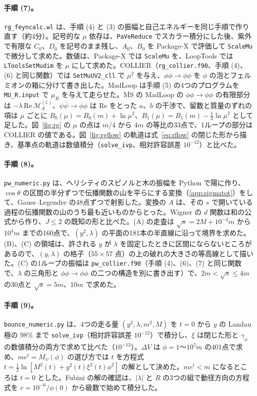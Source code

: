 \documentclass[a4paper,10pt]{ltjsarticle}
\newcommand{\MSbar}{\overline{\mathrm{MS}}}
\begin{document}
\paragraph{手順 (7)。}\texttt{rg\_feyncalc.wl} は、手順 (4) と (3) の振幅と自己エネルギーを同じ手順で作り直す（約4分）。記号的な $\mu$ 依存は、\texttt{PaVeReduce} でスカラー積分にした後、紫外で有限な $C_0$、$D_0$ を記号のまま残し、$A_0$、$B_0$ を Package-X で評価して \texttt{ScaleMu} で微分して求めた。数値は、Package-X では \texttt{ScaleMu} を、LoopTools では \texttt{LToolsSetMudim} を $\mu$ にして求めた。COLLIER（\texttt{rg\_collier.f90}、手順 (4)、(6) と同じ関数）では \texttt{SetMuUV2\_cll} で $\mu^2$ を与え、$\phi\phi\to\phi\phi$ を $\phi$ の泡とフェルミオンの箱に分けて書き出した。MadLoop は手順 (5) の4つのプログラムを \texttt{MU\_R.input} で $\mu_R$ を与えて走らせた。$\MSbar$ の MadLoop の $\phi\phi\to\phi\phi$ の有限部分は $-\lambda\,\mathrm{Re}\,\mathcal M_A^{(1)}$、$\psi\bar\psi\to\phi\phi$ は $\mathrm{Re}$ をとった $a$、$b$ の干渉で、留数と質量のずれの項は $\mu$ ごとに $B_0(\mu)=B_0(m)+\ln\mu^2$、$B_1(\mu)=B_1(m)-\frac12\ln\mu^2$ として足した。図~\ref{fig:rg} の $\mu$ の点は $m/4$ から $4m$ の等比の33点で、1ループの部分は COLLIER の値である。図~\ref{fig:rgflow} の軌道は式~\eqref{eq:rflow} の閉じた形から描き、基準点の軌道は数値積分（\texttt{solve\_ivp}、相対許容誤差 $10^{-12}$）と比べた。

\paragraph{手順 (8)。}\texttt{pw\_numeric.py} は、ヘリシティのスピノルと木の振幅を Python で陽に作り、$\cos\theta$ の区間の半分ずつで伝播関数の山を平らにする変換（\ref{app:sigmatot}）をして、Gauss--Legendre の48点ずつで射影した。変換の $A$ は、その $s$ で開いている過程の伝播関数の山のうち最も近いものからとった。Wigner の $d$ 関数は和の公式から作り、$J\le2$ の既知の形と比べた。(A) の走査は $\sqrt s=2M+10^{-4}m$ から $10^4m$ までの160点で、$(y^2,\lambda)$ の平面の181本の半直線に沿って境界を求めた。(B)、(C) の領域は、許される $y$ が $\lambda$ を固定したときに区間にならないところがあるので、$(y,\lambda)$ の格子（$55\times57$ 点）の上の破れの大きさの等高線として描いた。(C) の1ループの振幅は \texttt{pw\_collier.f90}（手順 (4)、(6)、(7) と同じ関数で、$\lambda$ の三角形と $\phi\phi\to\phi\phi$ の二つの構造を別に書き出す）で、$2m<\sqrt s\le4m$ の30点と $\sqrt s=5m$、$10m$ で求めた。

\paragraph{手順 (9)。}\texttt{bounce\_numeric.py} は、4つの走る量 $(y^2,\lambda,m^2,M)$ を $t=0$ から $y$ の Landau 極の $98\%$ まで \texttt{solve\_ivp}（相対許容誤差 $10^{-12}$）で積分し、$\xi$ は閉じた形と $\gamma_\phi$ の数値積分の両方で求めて比べた（$10^{-13}$）。$\Delta V$ は $\phi=1$〜$10^5m$ の401点で求め、$me^t=M_\psi(\phi)$ の選び方では $t$ を方程式 $t=\frac12\ln[M^2(t)+y^2(t)\xi^2(t)\phi^2]$ の解として決めた。$me^t<m$ になるところは $t=0$ とした。Fubini の解の確認は、$|\lambda|$ と $R$ の3つの組で動径方向の方程式を $r=10^{-6}/\phi(0)$ から級数で始めて積分した。
\end{document}
